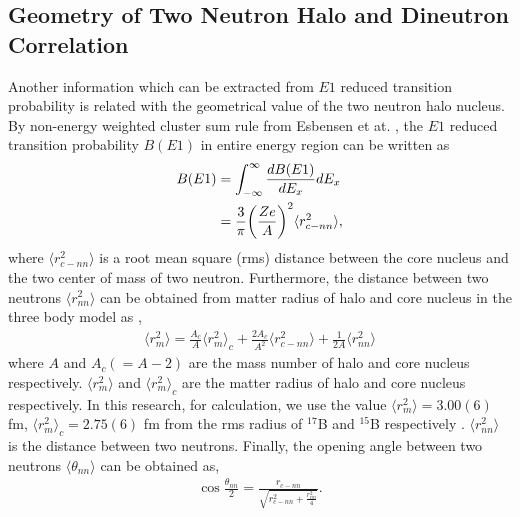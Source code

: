 \subsection{Geometry of Two Neutron Halo and Dineutron Correlation}
Another information which can be extracted from $E1$ reduced transition probability is related with the geometrical value of the two neutron halo nucleus. By non-energy weighted cluster sum rule from Esbensen et at. \cite{Esbensen}, the $E1$ reduced transition probability $B(E1)$ in entire energy region can be written as 
\begin{align}
    B(E1) &= \int_{-\infty}^{\infty} \frac{dB(E1)}{dE_x}dE_x \notag \\
        &= \frac{3}{\pi} \bigg(\frac{Z e}{A}\bigg)^2 \langle r^2_{c-nn} \rangle,
\end{align}
where $\langle r^2_{c-nn} \rangle$ is a root mean square (rms) distance between the core nucleus and the two center of mass of two neutron. Furthermore, the distance between two neutrons $\langle r^2_{nn} \rangle$ can be obtained from matter radius of halo and core nucleus in the three body model as \cite{Bertulani07}\cite{Hagino07},
\begin{align}
    \langle r^2_{m} \rangle = \frac{A_c}{A} \langle r^2_{m} \rangle_{c} + \frac{2A_c}{A^2} \langle r^2_{c-nn} \rangle + \frac{1}{2A} \langle r^2_{nn} \rangle
\end{align}
where $A$ and $A_c (= A - 2)$ are the mass number of halo and core nucleus respectively. $\langle r^2_{m} \rangle$ and $\langle r^2_{m} \rangle_{c}$ are the matter radius of halo and core nucleus respectively. In this research, for calculation, we use the value $\langle r^2_{m} \rangle = 3.00 (6)$ fm, $\langle r^2_{m} \rangle_c = 2.75 (6)$ fm from the rms radius of $^{17}$B and $^{15}$B respectively \cite{Estrade}. $\langle r^2_{nn} \rangle$ is the distance between two neutrons.
Finally, the opening angle between two neutrons $\langle \theta_{nn} \rangle$ can be obtained as,
\begin{align}
    \cos \frac{\theta_{nn}}{2} = \frac{r_{c-nn}}{\sqrt{r^2_{c-nn} + \frac{r^2_{nn}}{4}} }.
\end{align}


